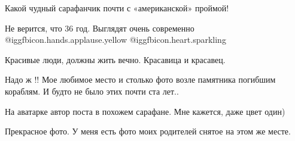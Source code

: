  
 
 
 
 

Какой чудный сарафанчик почти с «американской» проймой!

Не верится, что 36 год. Выглядят очень современно
@igg{fbicon.hands.applause.yellow}  @igg{fbicon.heart.sparkling} 

Красивые люди, должны жить вечно. Красавица и красавец.

Надо ж !! Мое любимое место и столько фото возле памятника погибшим кораблям. И
будто не было этих почти ста лет..

На аватарке автор поста в похожем сарафане. Мне кажется, даже цвет один)

Прекрасное фото. У меня есть фото моих родителей снятое на этом же месте.
